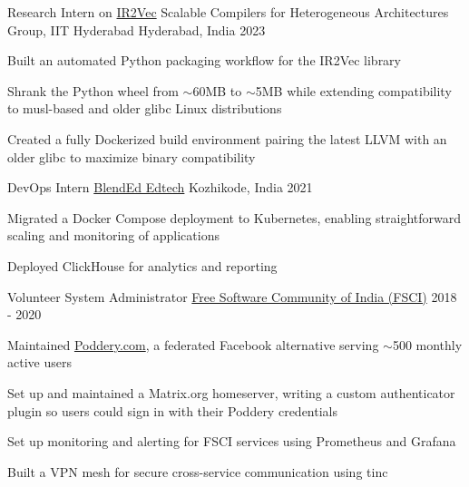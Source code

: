 \begin{cventries}
  \cventry
    {Research Intern on \href{https://github.com/IITH-Compilers/IR2Vec}{IR2Vec}} %
    {Scalable Compilers for Heterogeneous Architectures Group, IIT Hyderabad} %
    {Hyderabad, India} %
    {2023} %
    {
      \begin{cvitems} %
        \item {Built an automated Python packaging workflow for the IR2Vec library}
        \item {Shrank the Python wheel from $\sim$60MB to $\sim$5MB while extending compatibility to musl-based and older glibc Linux distributions}
        \item {Created a fully Dockerized build environment pairing the latest LLVM with an older glibc to maximize binary compatibility}
      \end{cvitems}
    }

  \cventry
    {DevOps Intern} %
    {\href{https://blend-ed.org/}{BlendEd Edtech}} %
    {Kozhikode, India} %
    {2021} %
    {
      \begin{cvitems} %
        \item {Migrated a Docker Compose deployment to Kubernetes, enabling straightforward scaling and monitoring of applications}
        \item {Deployed ClickHouse for analytics and reporting}
      \end{cvitems}
    }

  \cventry
    {Volunteer System Administrator} %
    {\href{https://fsci.in}{Free Software Community of India (FSCI)}} %
    {} %
    {2018 - 2020} %
    {
      \begin{cvitems} %
        \item {Maintained \href{https://poddery.com}{Poddery.com}, a federated Facebook alternative serving $\sim$500 monthly active users}
        \item {Set up and maintained a Matrix.org homeserver, writing a custom authenticator plugin so users could sign in with their Poddery credentials}
        \item {Set up monitoring and alerting for FSCI services using Prometheus and Grafana}
        \item {Built a VPN mesh for secure cross-service communication using tinc}
      \end{cvitems}
    }
\end{cventries}

